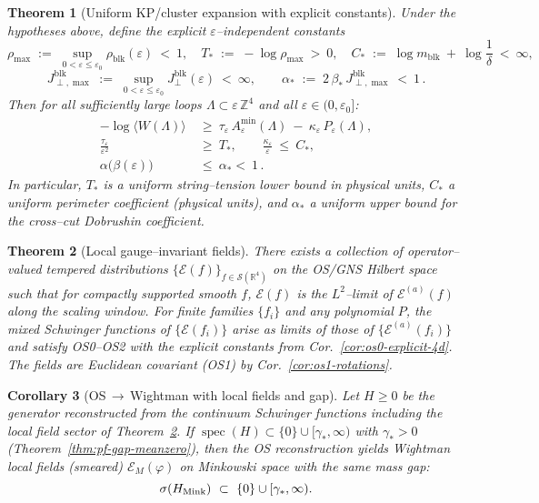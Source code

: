 \documentclass[11pt]{amsart}
\theoremstyle{plain}
\newtheorem{theorem}{Theorem}[section]
\newtheorem{corollary}[theorem]{Corollary}
\theoremstyle{definition}
\theoremstyle{remark}
\renewcommand{\tfrac}[2]{\textstyle\frac{#1}{#2}}
\begin{document}
\begin{theorem}[Uniform KP/cluster expansion with explicit constants]
\label{thm:uniform-kp}
Under the hypotheses above, define the explicit $\varepsilon$–independent constants
\[
  \rho_{\max}\;:=\;\sup_{0<\varepsilon\le \varepsilon_0}\rho_{\mathrm{blk}}(\varepsilon)\ <\ 1,\quad
  T_*\;:=\; -\log \rho_{\max}\ >\ 0,\quad
  C_*\;:=\; \log m_{\mathrm{blk}}\ +\ \log\tfrac{1}{\delta}\ <\ \infty,
\]
\[
  J^{\mathrm{blk}}_{\perp,\max}\;:=\;\sup_{0<\varepsilon\le\varepsilon_0} J^{\mathrm{blk}}_{\perp}(\varepsilon)\ <\ \infty,\qquad
  \alpha_*\;:=\;2\,\beta_*\,J^{\mathrm{blk}}_{\perp,\max}\ <\ 1\,.
\]
Then for all sufficiently large loops $\Lambda\subset\varepsilon\,\mathbb Z^4$ and all $\varepsilon\in(0,\varepsilon_0]$:
\begin{align}
  -\log\langle W(\Lambda)\rangle\ &\ge\ \tau_\varepsilon\,A_\varepsilon^{\min}(\Lambda)\ -\ \kappa_\varepsilon\,P_\varepsilon(\Lambda),\\
  \frac{\tau_\varepsilon}{\varepsilon^2}\ &\ge\ T_*,\qquad \frac{\kappa_\varepsilon}{\varepsilon}\ \le\ C_*,\\
  \alpha\bigl(\beta(\varepsilon)\bigr)\ &\le\ \alpha_* <\ 1\,.
\end{align}
In particular, $T_*$ is a uniform string–tension lower bound in physical units, $C_*$ a uniform perimeter coefficient (physical units), and $\alpha_*$ a uniform upper bound for the cross–cut Dobrushin coefficient.
\end{theorem}
 

\begin{theorem}[Local gauge–invariant fields]\label{thm:local-fields-exist}
There exists a collection of operator–valued tempered distributions $\{\mathcal E(f)\}_{f\in \mathcal S(\mathbb R^4)}$ on the OS/GNS Hilbert space such that for compactly supported smooth $f$, $\mathcal E(f)$ is the $L^2$–limit of $\mathcal E^{(a)}(f)$ along the scaling window. For finite families $\{f_i\}$ and any polynomial $P$, the mixed Schwinger functions of $\{\mathcal E(f_i)\}$ arise as limits of those of $\{\mathcal E^{(a)}(f_i)\}$ and satisfy OS0–OS2 with the explicit constants from Cor.~\ref{cor:os0-explicit-4d}. The fields are Euclidean covariant (OS1) by Cor.~\ref{cor:os1-rotations}.
\end{theorem}

\begin{corollary}[OS\,$\to$\,Wightman with local fields and gap]\label{cor:wightman-local-gap}
Let $H\ge 0$ be the generator reconstructed from the continuum Schwinger functions including the local field sector of Theorem~\ref{thm:local-fields-exist}. If $\operatorname{spec}(H)\subset\{0\}\cup[\gamma_*,\infty)$ with $\gamma_*>0$ (Theorem~\ref{thm:pf-gap-meanzero}), then the OS reconstruction yields Wightman local fields (smeared) $\mathcal E_M(\varphi)$ on Minkowski space with the same mass gap:
\[
  \sigma(H_{\rm Mink})\ \subset\ \{0\}\cup[\gamma_*,\infty).
\]
\end{corollary}
\end{document}
